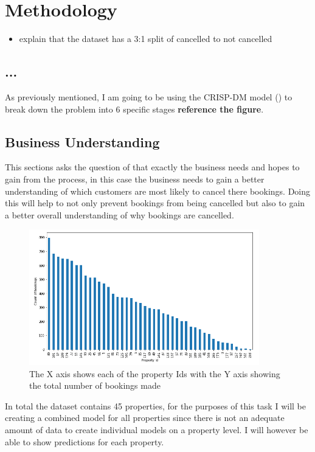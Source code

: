 \chapter{Methodology}
\label{ch:method}

\begin{itemize}
\item explain that the dataset has a 3:1 split of cancelled to not cancelled
\end{itemize}

\section{...}
As previously mentioned, I am going to be using the CRISP-DM model (\cite{WirthCRISP-DM:Mining}) to break down the problem into 6 specific stages \textbf{reference the figure}.


\section{Business Understanding}

This sections asks the question of that exactly the business needs and hopes to gain from the process, in this case the business needs to gain a better understanding of which customers are most likely to cancel there bookings. Doing this will help to not only prevent bookings from being cancelled but also to gain a better overall understanding of why bookings are cancelled. 

\begin{figure}[hbt!]
 \includegraphics[width=10cm]{figures/bookings_by_property.png}
 \caption{The X axis shows each of the property Ids with the Y axis showing the total number of bookings made}
\end{figure}

In total the dataset contains 45 properties, for the purposes of this task I will be creating a combined model for all properties since there is not an adequate amount of data to create individual models on a property level. I will however be able to show predictions for each property. 

